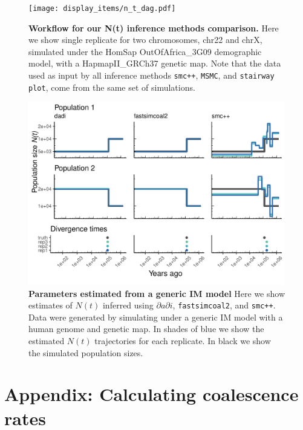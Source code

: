 \documentclass[12pt,halfline,a4paper]{ouparticle}
\newcommand{\stopsupplement}{%
        \setcounter{table}{0}
        \renewcommand{\thetable}{\arabic{table}}%
        \renewcommand{\theHtable}{X\thetable}
        \setcounter{figure}{0}
        \renewcommand{\thefigure}{\arabic{figure}}%
        \renewcommand{\theHfigure}{X\thefigure}
     }
\newcommand{\dadi}{$\partial a \partial i$\xspace}
\newcommand{\MSMC}{\texttt{MSMC}\xspace}
\newcommand{\smcpp}{\texttt{smc++}\xspace}
\newcommand{\stairwayplot}{\texttt{stairway plot}\xspace}
\begin{document}
\begin{figure}
\begin{center}
\texttt{[image: display\_items/n\_t\_dag.pdf]}
\caption{\textbf{Workflow for our N(t) inference methods comparison.}
Here we show single replicate for two chromosomes, chr22 and chrX, simulated under the HomSap
OutOfAfrica\_3G09 demographic model, with a HapmapII\_GRCh37 genetic map.
Note that the data used as input by all inference methods \smcpp, \MSMC, and \stairwayplot,
come from the same set of simulations.}
\label{fig:n_t_dag}
\end{center}
\end{figure}


\begin{figure}
\begin{center}
\includegraphics[width=0.8\linewidth]{display_items/generic_IM.pdf}
\caption{\textbf{Parameters estimated from a generic IM model} Here we show estimates of $N(t)$
inferred using \dadi, \texttt{fastsimcoal2}, and \smcpp. Data were generated by simulating
under a generic IM model with a human genome and \cite{international2007second} genetic map.
In shades of blue we show the estimated
$N(t)$ trajectories for each replicate. In black we show the simulated population sizes.}
\label{fig:generic_IM}
\end{center}
\end{figure}



\stopsupplement

\appendix

\section*{Appendix: Calculating coalescence rates}
\end{document}

